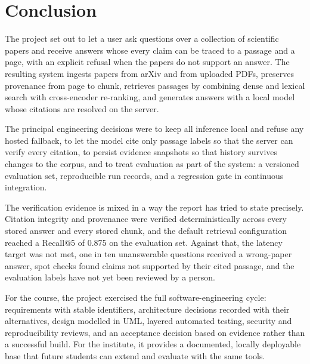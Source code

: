 \chapter{Conclusion}\label{ch:conclusion}

The project set out to let a user ask questions over a collection of scientific papers and receive answers whose
every claim can be traced to a passage and a page, with an explicit refusal when the papers do not support an
answer. The resulting system ingests papers from arXiv and from uploaded PDFs, preserves provenance from page to
chunk, retrieves passages by combining dense and lexical search with cross-encoder re-ranking, and generates answers
with a local model whose citations are resolved on the server.

The principal engineering decisions were to keep all inference local and refuse any hosted fallback, to let the
model cite only passage labels so that the server can verify every citation, to persist evidence snapshots so that
history survives changes to the corpus, and to treat evaluation as part of the system: a versioned evaluation set,
reproducible run records, and a regression gate in continuous integration.

The verification evidence is mixed in a way the report has tried to state precisely. Citation integrity and
provenance were verified deterministically across every stored answer and every stored chunk, and the default
retrieval configuration reached a Recall@5 of 0.875 on the evaluation set. Against that, the latency target was not
met, one in ten unanswerable questions received a wrong-paper answer, spot checks found claims not supported by their
cited passage, and the evaluation labels have not yet been reviewed by a person.

For the course, the project exercised the full software-engineering cycle: requirements with stable identifiers,
architecture decisions recorded with their alternatives, design modelled in UML, layered automated testing, security
and reproducibility reviews, and an acceptance decision based on evidence rather than a successful build. For the
institute, it provides a documented, locally deployable base that future students can extend and evaluate with the
same tools.

